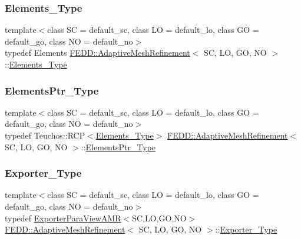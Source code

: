 \subsubsection{\texorpdfstring{Elements\+\_\+\+Type}{Elements\_Type}}
{\footnotesize\ttfamily template$<$class SC = default\+\_\+sc, class LO = default\+\_\+lo, class GO = default\+\_\+go, class NO = default\+\_\+no$>$ \\
typedef Elements \hyperlink{classFEDD_1_1AdaptiveMeshRefinement}{F\+E\+D\+D\+::\+Adaptive\+Mesh\+Refinement}$<$ SC, LO, GO, NO $>$\+::\hyperlink{classFEDD_1_1AdaptiveMeshRefinement_ae08f7ca72876c1aba944120b3ca088d3}{Elements\+\_\+\+Type}}

\mbox{\label{classFEDD_1_1AdaptiveMeshRefinement_a9a08c5e3801ff9f9f3dff7997f9f4b1b}} 
\subsubsection{\texorpdfstring{Elements\+Ptr\+\_\+\+Type}{ElementsPtr\_Type}}
{\footnotesize\ttfamily template$<$class SC = default\+\_\+sc, class LO = default\+\_\+lo, class GO = default\+\_\+go, class NO = default\+\_\+no$>$ \\
typedef Teuchos\+::\+R\+CP$<$\hyperlink{classFEDD_1_1AdaptiveMeshRefinement_ae08f7ca72876c1aba944120b3ca088d3}{Elements\+\_\+\+Type}$>$ \hyperlink{classFEDD_1_1AdaptiveMeshRefinement}{F\+E\+D\+D\+::\+Adaptive\+Mesh\+Refinement}$<$ SC, LO, GO, NO $>$\+::\hyperlink{classFEDD_1_1AdaptiveMeshRefinement_a9a08c5e3801ff9f9f3dff7997f9f4b1b}{Elements\+Ptr\+\_\+\+Type}}

\mbox{\label{classFEDD_1_1AdaptiveMeshRefinement_a3f493149d664db5c1024f27f87f0ac15}} 
\subsubsection{\texorpdfstring{Exporter\+\_\+\+Type}{Exporter\_Type}}
{\footnotesize\ttfamily template$<$class SC = default\+\_\+sc, class LO = default\+\_\+lo, class GO = default\+\_\+go, class NO = default\+\_\+no$>$ \\
typedef \hyperlink{classFEDD_1_1ExporterParaViewAMR}{Exporter\+Para\+View\+A\+MR}$<$SC,LO,GO,NO$>$ \hyperlink{classFEDD_1_1AdaptiveMeshRefinement}{F\+E\+D\+D\+::\+Adaptive\+Mesh\+Refinement}$<$ SC, LO, GO, NO $>$\+::\hyperlink{classFEDD_1_1AdaptiveMeshRefinement_a3f493149d664db5c1024f27f87f0ac15}{Exporter\+\_\+\+Type}}

